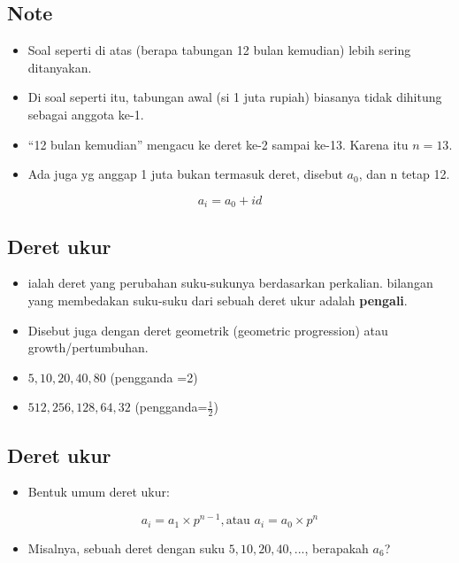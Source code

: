 \documentclass[
  letterpaper,
  DIV=11,
  numbers=noendperiod]{scrartcl}
\providecommand{\tightlist}{%
  \setlength{\itemsep}{0pt}\setlength{\parskip}{0pt}}\usepackage{longtable,booktabs,array}
\begin{document}
\hypertarget{note-1}{%
\subsection{Note}\label{note-1}}

\begin{itemize}
\item
  Soal seperti di atas (berapa tabungan 12 bulan kemudian) lebih sering
  ditanyakan.
\item
  Di soal seperti itu, tabungan awal (si 1 juta rupiah) biasanya tidak
  dihitung sebagai anggota ke-1.
\item
  ``12 bulan kemudian'' mengacu ke deret ke-2 sampai ke-13. Karena itu
  \(n=13\).
\item
  Ada juga yg anggap 1 juta bukan termasuk deret, disebut \(a_0\), dan n
  tetap 12.
\end{itemize}

\[
a_i=a_0+id
\]

\hypertarget{deret-ukur}{%
\subsection{Deret ukur}\label{deret-ukur}}

\begin{itemize}
\item
  ialah deret yang perubahan suku-sukunya berdasarkan perkalian.
  bilangan yang membedakan suku-suku dari sebuah deret ukur adalah
  \textbf{pengali}.
\item
  Disebut juga dengan deret geometrik (geometric progression) atau
  growth/pertumbuhan.
\item
  \(5,10,20,40,80\) (pengganda =2)
\item
  \(512, 256, 128,64,32\) (pengganda=\(\frac{1}{2}\))
\end{itemize}

\hypertarget{deret-ukur-1}{%
\subsection{Deret ukur}\label{deret-ukur-1}}

\begin{itemize}
\tightlist
\item
  Bentuk umum deret ukur:
\end{itemize}

\[
a_i=a_1\times p^{n-1}, \text{atau } a_i=a_0\times p^n
\]

\begin{itemize}
\tightlist
\item
  Misalnya, sebuah deret dengan suku \(5,10,20,40,...\), berapakah
  \(a_6\)?
\end{itemize}
\end{document}
